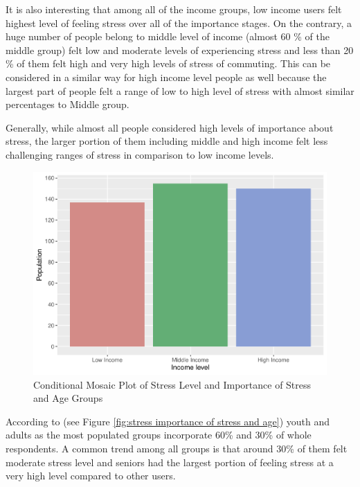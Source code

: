 \documentclass[
11pt, %
oneside, %
english, %
singlespacing, %
]{macthesis} %
\begin{document}
It is also interesting that among all of the income groups, low income users felt highest level of feeling stress over all of the importance stages. On the contrary, a huge number of people belong to middle level of income (almost 60 \% of the middle group) felt low and moderate levels of experiencing stress and less than 20 \% of them felt high and very high levels of stress of commuting. This can be considered in a similar way for high income level people as well because the largest part of people felt a range of low to high level of stress with almost similar percentages to Middle group.

Generally, while almost all people considered high levels of importance about stress, the larger portion of them including middle and high income felt less challenging ranges of stress in comparison to low income levels.
\begin{figure}
\includegraphics[width=0.85\linewidth]{thesis_files/figure-latex/unnamed-chunk-25-1} \caption{\label{fig:stress importance of stress and age}Conditional Mosaic Plot of Stress Level and Importance of Stress and Age Groups}\label{fig:unnamed-chunk-25}
\end{figure}
According to (see Figure \ref{fig:stress importance of stress and age}) youth and adults as the most populated groups incorporate 60\% and 30\% of whole respondents. A common trend among all groups is that around 30\% of them felt moderate stress level and seniors had the largest portion of feeling stress at a very high level compared to other users.
\end{document}
